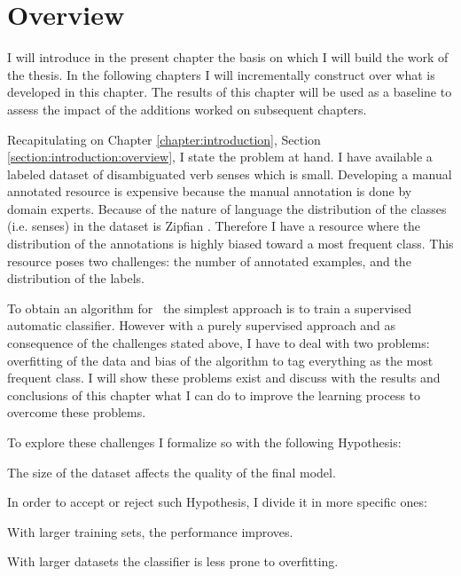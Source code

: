 \section{Overview}\label{sec:supervised:overview}

I will introduce in the present chapter the basis on which I will build the
work of the thesis. In the following chapters I will incrementally construct
over what is developed in this chapter. The results of this chapter will be
used as a baseline to assess the impact of the additions worked on subsequent
chapters.

Recapitulating on Chapter \ref{chapter:introduction}, Section
\ref{section:introduction:overview}, I state the problem at hand. I have
available a labeled dataset of disambiguated verb senses which is small.
Developing a manual annotated resource is expensive because the manual
annotation is done by domain experts. Because of the nature of language the
distribution of the classes (i.e. senses) in the dataset is Zipfian
\cite{j:zpf}. Therefore I have a resource where the distribution of the
annotations is highly biased toward a most frequent class. This resource poses
two challenges: the number of annotated examples, and the distribution of the
labels.

To obtain an algorithm for \vsd~the simplest approach is to train a supervised
automatic classifier. However with a purely supervised approach and as
consequence of the challenges stated above, I have to deal with two problems:
overfitting of the data and bias of the algorithm to tag everything as the most
frequent class. I will show these problems exist and discuss with the results
and conclusions of this chapter what I can do to improve the learning process
to overcome these problems.

To explore these challenges I formalize so with the following Hypothesis:

\begin{hypothesis}\label{hyp:supervised}
  The size of the dataset affects the quality of the final model.
\end{hypothesis}

In order to accept or reject such Hypothesis, I divide it in more specific
ones:

\begin{subhypothesis}\label{hyp:supervised:1}
  With larger training sets, the performance improves. 
\end{subhypothesis}

\begin{subhypothesis}\label{hyp:supervised:2}
  With larger datasets the classifier is less prone to overfitting. 
\end{subhypothesis}

